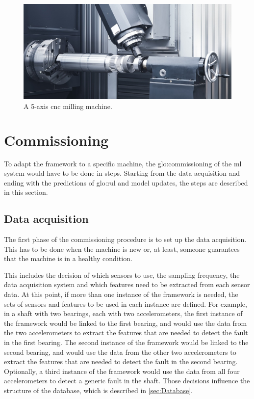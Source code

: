 \begin{figure}
  \centering
  \includegraphics[width=.7\textwidth]{images/Framework/millmachine.jpg}
  \caption{A 5-axis \gls{cnc} milling machine. \cite{FagorAutomation}}
  \label{fig:cnc}
\end{figure}

\section{Commissioning}
To adapt the framework to a specific machine, the \gls{glo:commissioning} of the \gls{ml} system would have to be done in steps. Starting from the data acquisition and ending with the predictions of \gls{glo:rul} and model updates, the steps are described in this section.

\subsection{Data acquisition}

The first phase of the commissioning procedure is to set up the data acquisition. This has to be done when the machine is new or, at least, someone guarantees that the machine is in a healthy condition.

This includes the decision of which sensors to use, the sampling frequency, the data acquisition system and which features need to be extracted from each sensor data. At this point, if more than one instance of the framework is needed, the sets of sensors and features to be used in each instance are defined. For example, in a shaft with two bearings, each with two accelerometers, the first instance of the framework would be linked to the first bearing, and would use the data from the two accelerometers to extract the features that are needed to detect the fault in the first bearing. The second instance of the framework would be linked to the second bearing, and would use the data from the other two accelerometers to extract the features that are needed to detect the fault in the second bearing. Optionally, a third instance of the framework would use the data from all four accelerometers to detect a generic fault in the shaft.
Those decisions influence the structure of the database, which is described in \autoref{sec:Database}. 

